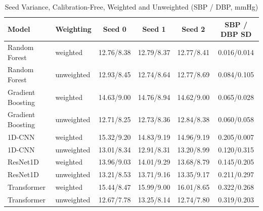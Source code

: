 \documentclass[journal]{IEEEtran}
\begin{document}
\begin{table}[!t]
\caption{Seed Variance, Calibration-Free, Weighted and Unweighted (SBP / DBP, mmHg)}
\label{tab:seeds}
\centering
\begin{tabular}{llcccc}
\toprule
Model & Weighting & Seed 0 & Seed 1 & Seed 2 & SBP / DBP SD \\
\midrule
Random Forest & weighted & 12.76/8.38 & 12.79/8.37 & 12.77/8.41 & 0.016/0.014 \\
Random Forest & unweighted & 12.93/8.45 & 12.74/8.64 & 12.77/8.69 & 0.084/0.105 \\
Gradient Boosting & weighted & 14.63/9.00 & 14.76/8.94 & 14.62/9.00 & 0.065/0.028 \\
Gradient Boosting & unweighted & 12.71/8.25 & 12.73/8.36 & 12.84/8.38 & 0.060/0.058 \\
1D-CNN & weighted & 15.32/9.20 & 14.83/9.19 & 14.96/9.19 & 0.205/0.007 \\
1D-CNN & unweighted & 13.01/8.34 & 12.91/8.31 & 13.20/8.99 & 0.120/0.315 \\
ResNet1D & weighted & 13.96/9.03 & 14.01/9.29 & 13.68/8.79 & 0.145/0.205 \\
ResNet1D & unweighted & 13.21/8.53 & 13.71/9.16 & 13.35/9.17 & 0.211/0.297 \\
Transformer & weighted & 15.44/8.47 & 15.99/9.00 & 16.01/8.65 & 0.322/0.268 \\
Transformer & unweighted & 12.67/7.78 & 13.25/8.14 & 12.74/7.80 & 0.319/0.203 \\
\bottomrule
\end{tabular}
\end{table}
\end{document}
